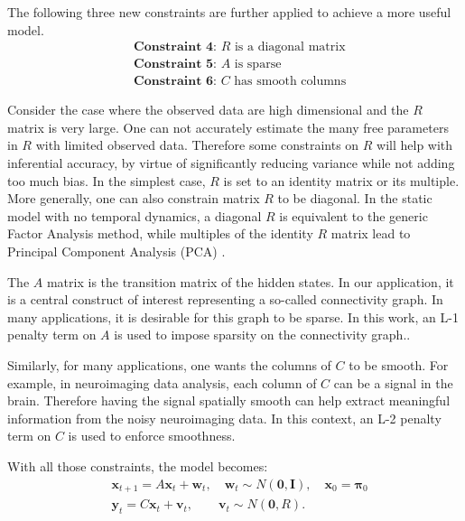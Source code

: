 \documentclass[fleqn]{article}
\begin{document}
The following three new constraints are further applied to achieve a more useful model.
\vspace*{-3mm}
\begin{equation*}\label{eqn:constraints2}
\begin{aligned}
&\textbf{Constraint 4: }R\text{ is a diagonal matrix}\\
&\textbf{Constraint 5: }A\text{ is sparse}\\
&\textbf{Constraint 6: }C\text{ has smooth columns}
\end{aligned}
\end{equation*}

Consider the case where the observed data are high dimensional and the $R$ matrix is very large. One can not accurately estimate the many free parameters in $R$ with limited observed data. Therefore some constraints on $R$ will help with inferential accuracy, by virtue of significantly reducing variance while not adding too much bias. In the simplest case, $R$ is set to an identity matrix or its multiple. More generally, one can also constrain matrix $R$ to be diagonal. In the static model with no temporal dynamics, a diagonal $R$ is equivalent to the generic Factor Analysis method, while multiples of the identity $R$ matrix lead to Principal Component Analysis (PCA) \cite{roweis1999unifying}.

The $A$ matrix is the transition matrix of the hidden states. In our application, it is a central construct of interest representing a so-called connectivity graph. In many applications, it is desirable for this graph to be sparse. In this work, an L-1 penalty term on $A$ is used to impose sparsity on the connectivity graph..

Similarly, for many applications, one wants the columns of $C$ to be smooth. For example, in neuroimaging data analysis, each column of $C$ can be a signal in the brain. Therefore having the signal spatially smooth can help extract meaningful information from the noisy neuroimaging data. In this context, an L-2 penalty term on $C$ is used to enforce smoothness.

With all those constraints, the model becomes:
\begin{equation}\label{eq:model0}
\begin{aligned}
	&\mathbf{x}_{t+1}=A\mathbf{x}_{t}+\mathbf{w}_t, \quad \mathbf{w}_t\sim N(\mathbf{0},\mathbf{I}),\quad \mathbf{x}_0 = \mathbf{\pi}_0\\
	&\mathbf{y}_t=C\mathbf{x}_t+\mathbf{v}_t,\qquad \mathbf{v}_t\sim N(\mathbf{0},R).
\end{aligned}
\end{equation}
\end{document}
